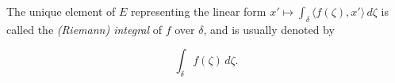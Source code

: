 The unique element of $E$ representing the linear form $x' \mapsto \int_{\delta} \langle f(\zeta), x' \rangle \, d\zeta$ is called the \emph{(Riemann) integral} of $f$ over $\delta$, and is usually denoted by

$$\int_{\delta} f(\zeta) \, d\zeta.$$
